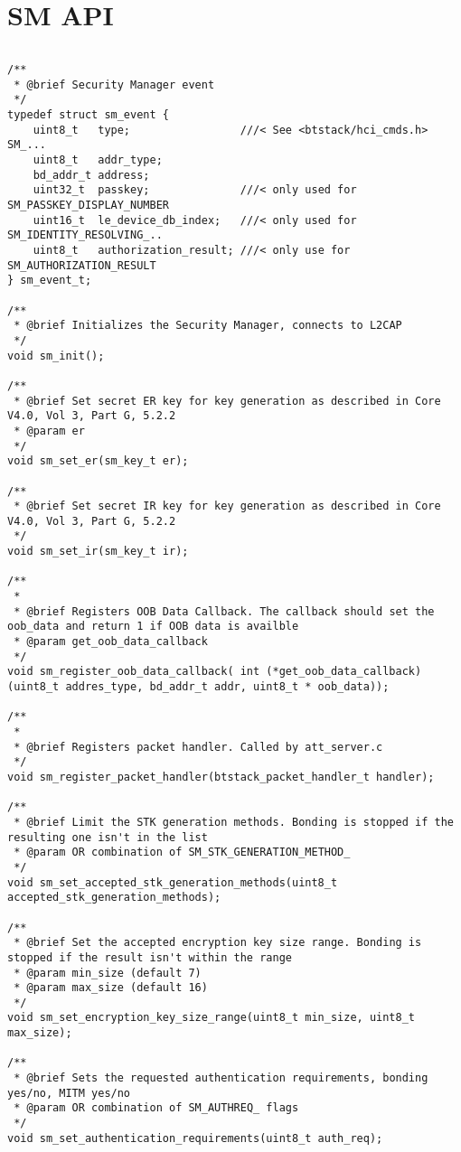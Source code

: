 \section{SM API}
\label{appendix:api_sm}
$ $
\begin{lstlisting}
/**
 * @brief Security Manager event
 */
typedef struct sm_event {
    uint8_t   type;                 ///< See <btstack/hci_cmds.h> SM_...
    uint8_t   addr_type;
    bd_addr_t address;
    uint32_t  passkey;              ///< only used for SM_PASSKEY_DISPLAY_NUMBER 
    uint16_t  le_device_db_index;   ///< only used for SM_IDENTITY_RESOLVING_..
    uint8_t   authorization_result; ///< only use for SM_AUTHORIZATION_RESULT
} sm_event_t;

/**
 * @brief Initializes the Security Manager, connects to L2CAP
 */
void sm_init();

/**
 * @brief Set secret ER key for key generation as described in Core V4.0, Vol 3, Part G, 5.2.2 
 * @param er
 */
void sm_set_er(sm_key_t er);

/**
 * @brief Set secret IR key for key generation as described in Core V4.0, Vol 3, Part G, 5.2.2 
 */
void sm_set_ir(sm_key_t ir);

/**
 *
 * @brief Registers OOB Data Callback. The callback should set the oob_data and return 1 if OOB data is availble
 * @param get_oob_data_callback
 */
void sm_register_oob_data_callback( int (*get_oob_data_callback)(uint8_t addres_type, bd_addr_t addr, uint8_t * oob_data));

/**
 *
 * @brief Registers packet handler. Called by att_server.c
 */
void sm_register_packet_handler(btstack_packet_handler_t handler);

/**
 * @brief Limit the STK generation methods. Bonding is stopped if the resulting one isn't in the list
 * @param OR combination of SM_STK_GENERATION_METHOD_ 
 */
void sm_set_accepted_stk_generation_methods(uint8_t accepted_stk_generation_methods);

/**
 * @brief Set the accepted encryption key size range. Bonding is stopped if the result isn't within the range
 * @param min_size (default 7)
 * @param max_size (default 16)
 */
void sm_set_encryption_key_size_range(uint8_t min_size, uint8_t max_size);

/**
 * @brief Sets the requested authentication requirements, bonding yes/no, MITM yes/no
 * @param OR combination of SM_AUTHREQ_ flags
 */
void sm_set_authentication_requirements(uint8_t auth_req);


\end{lstlisting}
